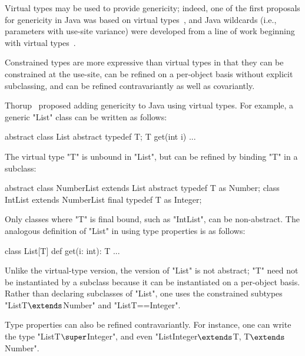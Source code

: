 Virtual types
may be used to provide genericity; indeed,
one of the first proposals for genericity in Java was based on
virtual types~\cite{thorup97}, and
Java
wildcards (i.e., parameters with use-site variance)
were developed from a line of work beginning with virtual
types~\cite{unifying-genericity,variant-parametric-types,adding-wildcards}.


Constrained types are more expressive than virtual
types in that they can be constrained at the use-site,
can be refined on a per-object basis without explicit subclassing,
and can be refined contravariantly as well as covariantly.

Thorup~\cite{thorup97}
proposed adding genericity to Java using virtual types.  For example,
a generic \xcd"List" class can be written as follows:
{
\begin{xten}
abstract class List {
  abstract typedef T;
  T get(int i) { ... }
}
\end{xten}}
\noindent
The virtual type \xcd"T" is unbound in \xcd"List", but 
can be refined by binding \xcd"T" in a subclass:
{
\begin{xten}
abstract class NumberList extends List {
  abstract typedef T as Number;
}
class IntList extends NumberList {
  final typedef T as Integer;
}
\end{xten}}
\noindent
Only classes where \xcd"T" is final bound, such as \xcd"IntList",
can be non-abstract.
%
The analogous definition of 
\xcd"List" in \Xten{} using type properties is as follows:
{
\begin{xten}
class List[T] {
  def get(i: int): T { ... }
}
\end{xten}}

\noindent
Unlike the virtual-type version,
the \Xten{} version of \xcd"List" is not abstract;
\xcd"T" need not be instantiated by a subclass because it can be
instantiated on a per-object basis.
Rather than declaring subclasses of \xcd"List",
one uses the constrained subtypes
\xcdmath"List{T$\extends$Number}" and \xcd"List{T==Integer}".

Type properties can also be refined contravariantly.
For instance, one can write the type \xcdmath"List{T$\super$Integer}",
and even \xcdmath"List{Integer$\extends$T, T$\extends$Number}".

